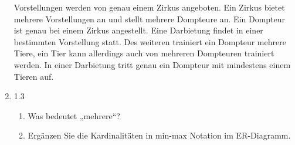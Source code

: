 \documentclass{bschlangaul-aufgabe}
\begin{document}
\begin{enumerate}
Vorstellungen werden von genau einem Zirkus angeboten. Ein Zirkus bietet
mehrere Vorstellungen an und stellt mehrere Dompteure an. Ein Dompteur
ist genau bei einem Zirkus angestellt. Eine Darbietung findet in einer
bestimmten Vorstellung statt. Des weiteren trainiert ein Dompteur
mehrere Tiere, ein Tier kann allerdings auch von mehreren Dompteuren
trainiert werden. In einer Darbietung tritt genau ein Dompteur mit
mindestens einem Tieren auf.

\item 1.3

\begin{enumerate}


\item Was bedeutet „mehrere“?


\item Ergänzen Sie die Kardinalitäten in min-max Notation im
ER-Diagramm.

\end{enumerate}

\end{enumerate}

\end{document}
